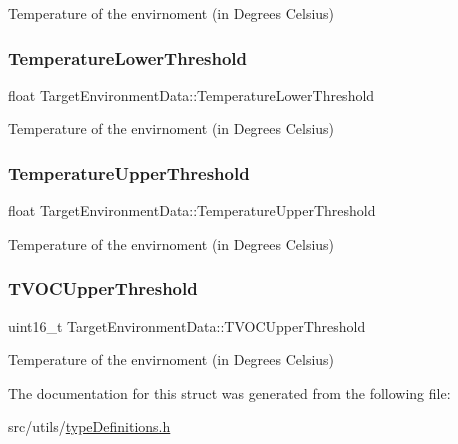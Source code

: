 Temperature of the envirnoment (in Degrees Celsius) \mbox{\label{structTargetEnvironmentData_a908d87e4fd88c513d671c591d0710ce0}} 
\subsubsection{\texorpdfstring{Temperature\+Lower\+Threshold}{TemperatureLowerThreshold}}
{\footnotesize\ttfamily float Target\+Environment\+Data\+::\+Temperature\+Lower\+Threshold}

Temperature of the envirnoment (in Degrees Celsius) \mbox{\label{structTargetEnvironmentData_a76d83792b14767a1bc23b57c027232d6}} 
\subsubsection{\texorpdfstring{Temperature\+Upper\+Threshold}{TemperatureUpperThreshold}}
{\footnotesize\ttfamily float Target\+Environment\+Data\+::\+Temperature\+Upper\+Threshold}

Temperature of the envirnoment (in Degrees Celsius) \mbox{\label{structTargetEnvironmentData_afdddfbd81d51a1831704d85b08e9df1a}} 
\subsubsection{\texorpdfstring{T\+V\+O\+C\+Upper\+Threshold}{TVOCUpperThreshold}}
{\footnotesize\ttfamily uint16\+\_\+t Target\+Environment\+Data\+::\+T\+V\+O\+C\+Upper\+Threshold}

Temperature of the envirnoment (in Degrees Celsius) 

The documentation for this struct was generated from the following file\+:\begin{DoxyCompactItemize}
\item 
src/utils/\hyperlink{typeDefinitions_8h}{type\+Definitions.\+h}\end{DoxyCompactItemize}
